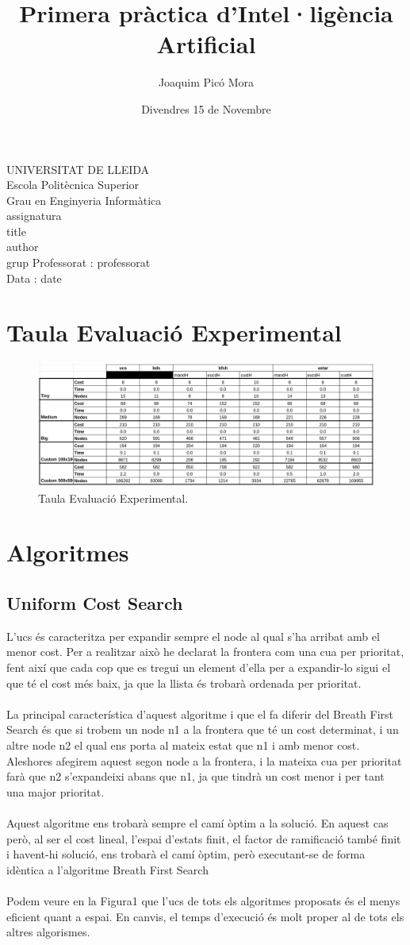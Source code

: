 \documentclass{article}
\title{Primera pràctica d'Intel·ligència Artificial}
\author{Joaquim Picó Mora}
\date{Divendres 15 de Novembre}
\renewcommand{\maketitle}{ %
    \begin{titlepage}
        \raggedright{UNIVERSITAT DE LLEIDA \\
            Escola Politècnica Superior \\
            Grau en Enginyeria Informàtica\\
            \1assignatura\\}
            \vspace{5cm}
            \centering\huge{\5title \\}
            \vspace{3cm}
            \large{\6author} \\
            \normalsize{\3grup}
            \vfill
            Professorat : \4professorat \\
            Data : \7date
\end{titlepage}}
\begin{document}
\maketitle
\thispagestyle{empty}

\newpage
{}
\tableofcontents
\newpage
{}

\section{Taula Evaluació Experimental}
\begin{figure}[h!]
	\centering
	\includegraphics[width=0.7\textheight]{taula.png}
	\caption{Taula Evaluació Experimental.}
	\label{tee}
\end{figure}
\section{Algoritmes}
%
\subsection{Uniform Cost Search}
L'ucs és caracteritza per expandir sempre el node al qual s'ha arribat amb el menor cost. Per a realitzar això he declarat la frontera com una cua per prioritat, fent així que cada cop que es tregui un element d'ella per a expandir-lo sigui el que té el cost més baix, ja que la llista és trobarà ordenada per prioritat.
\\\\
La principal característica d'aquest algoritme i que el fa diferir del Breath First Search és que si trobem un node n1 a la frontera que té un cost determinat, i un altre node n2 el qual ens porta al mateix estat que n1 i amb menor cost. Aleshores afegirem aquest segon node a la frontera, i la mateixa cua per prioritat farà que n2 s'expandeixi abans que n1, ja que tindrà un cost menor i per tant una major prioritat.
\\\\
Aquest algoritme ens trobarà sempre el camí òptim a la solució. En aquest cas però, al ser el cost lineal, l'espai d'estats finit, el factor de ramificació també finit i havent-hi solució, ens trobarà el camí òptim, però executant-se de forma idèntica a l'algoritme Breath First Search
\\\\
Podem veure en la Figura1 que l'ucs de tots els algoritmes proposats és el menys eficient quant a espai. En canvis, el temps d'execució és molt proper al de tots els altres algorismes.
\end{document}
